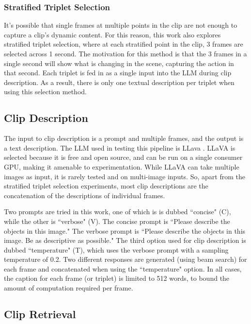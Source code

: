 \subsubsection{Stratified Triplet Selection}
It's possible that single frames at multiple points in the clip are not enough to capture a clip's dynamic content.
For this reason, this work also explores stratified triplet selection, where at each stratified point in the clip, 3 frames are selected across 1 second.
The motivation for this method is that the 3 frames in a single second will show what is changing in the scene, capturing the action in that second.
Each triplet is fed in as a single input into the LLM during clip description.
As a result, there is only one textual description per triplet when using this selection method.

\subsection{Clip Description}

The input to clip description is a prompt and multiple frames, and the output is a text description.
The LLM used in testing this pipeline is LLava \cite{llava}.
LLaVA is selected because it is free and open source, and can be run on a single consumer GPU, making it amenable to experimentation.
While LLaVA can take multiple images as input, it is rarely tested and on multi-image inputs.
So, apart from the stratified triplet selection experiments, most clip descriptions are the concatenation of the descriptions of individual frames.

Two prompts are tried in this work, one of which is is dubbed ``concise" (C), while the other is ``verbose" (V).
The concise prompt is ``Please describe the objects in this image."
The verbose prompt is ``Please describe the objects in this image. Be as descriptive as possible."
The third option used for clip description is dubbed ``temperature" (T), which uses the verbose prompt with a sampling temperature of 0.2. 
Two different responses are generated (using beam search) for each frame and concatenated when using the ``temperature" option.
In all cases, the caption for each frame (or triplet) is limited to 512 words, to bound the amount of computation required per frame.

\subsection{Clip Retrieval}


